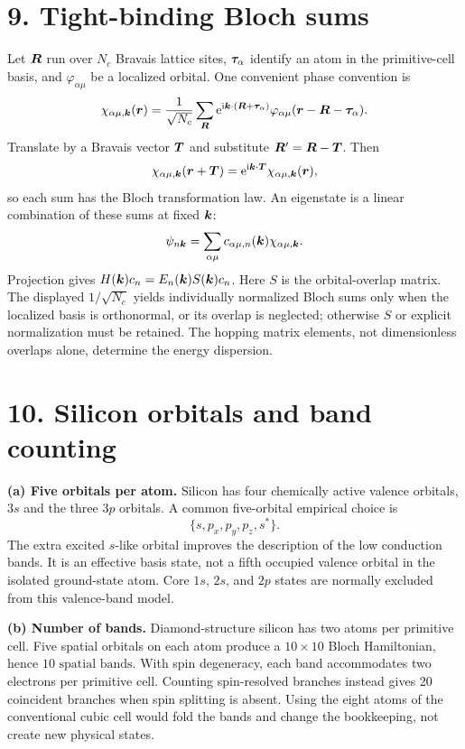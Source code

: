 \section*{9. Tight-binding Bloch sums}
Let $\boldsymbol{R}$ run over $N_c$ Bravais lattice sites, $\boldsymbol{\tau}_\alpha$ identify an atom in the primitive-cell basis, and $\varphi_{\alpha\mu}$ be a localized orbital. One convenient phase convention is
\[
\chi_{\alpha\mu,\boldsymbol{k}}(\boldsymbol{r})=\frac1{\sqrt{N_c}}
\sum_{\boldsymbol{R}}\mathrm{e}^{\mathrm{i}\boldsymbol{k}\cdot(\boldsymbol{R}+\boldsymbol{\tau}_\alpha)}
\varphi_{\alpha\mu}(\boldsymbol{r}-\boldsymbol{R}-\boldsymbol{\tau}_\alpha).
\]
Translate by a Bravais vector $\boldsymbol{T}$ and substitute $\boldsymbol{R}'=\boldsymbol{R}-\boldsymbol{T}$. Then
\[
\chi_{\alpha\mu,\boldsymbol{k}}(\boldsymbol{r}+\boldsymbol{T})
=\mathrm{e}^{\mathrm{i}\boldsymbol{k}\cdot\boldsymbol{T}}\chi_{\alpha\mu,\boldsymbol{k}}(\boldsymbol{r}),
\]
so each sum has the Bloch transformation law. An eigenstate is a linear combination of these sums at fixed $\boldsymbol{k}$:
\[
\psi_{n\boldsymbol{k}}=\sum_{\alpha\mu}c_{\alpha\mu,n}(\boldsymbol{k})\chi_{\alpha\mu,\boldsymbol{k}}.
\]
Projection gives $H(\boldsymbol{k})c_n=E_n(\boldsymbol{k})S(\boldsymbol{k})c_n$. Here $S$ is the orbital-overlap matrix. The displayed $1/\sqrt{N_c}$ yields individually normalized Bloch sums only when the localized basis is orthonormal, or its overlap is neglected; otherwise $S$ or explicit normalization must be retained. The hopping matrix elements, not dimensionless overlaps alone, determine the energy dispersion.

\section*{10. Silicon orbitals and band counting}
\textbf{(a) Five orbitals per atom.} Silicon has four chemically active valence orbitals, $3s$ and the three $3p$ orbitals. A common five-orbital empirical choice is
\[
\boxed{\{s,p_x,p_y,p_z,s^*\}.}
\]
The extra excited $s$-like orbital improves the description of the low conduction bands. It is an effective basis state, not a fifth occupied valence orbital in the isolated ground-state atom. Core $1s$, $2s$, and $2p$ states are normally excluded from this valence-band model.

\textbf{(b) Number of bands.} Diamond-structure silicon has two atoms per primitive cell. Five spatial orbitals on each atom produce a $10\times10$ Bloch Hamiltonian, hence $\boxed{10\text{ spatial bands}}$. With spin degeneracy, each band accommodates two electrons per primitive cell. Counting spin-resolved branches instead gives 20 coincident branches when spin splitting is absent. Using the eight atoms of the conventional cubic cell would fold the bands and change the bookkeeping, not create new physical states.

